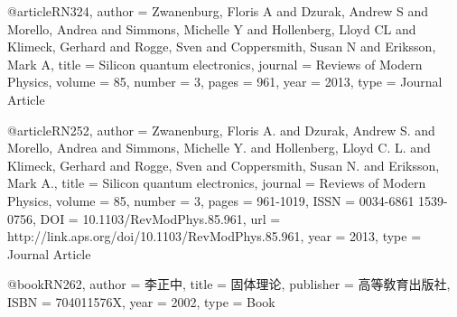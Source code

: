 @article{RN324,
   author = {Zwanenburg, Floris A and Dzurak, Andrew S and Morello, Andrea and Simmons, Michelle Y and Hollenberg, Lloyd CL and Klimeck, Gerhard and Rogge, Sven and Coppersmith, Susan N and Eriksson, Mark A},
   title = {Silicon quantum electronics},
   journal = {Reviews of Modern Physics},
   volume = {85},
   number = {3},
   pages = {961},
   year = {2013},
   type = {Journal Article}
}

@article{RN252,
   author = {Zwanenburg, Floris A. and Dzurak, Andrew S. and Morello, Andrea and Simmons, Michelle Y. and Hollenberg, Lloyd C. L. and Klimeck, Gerhard and Rogge, Sven and Coppersmith, Susan N. and Eriksson, Mark A.},
   title = {Silicon quantum electronics},
   journal = {Reviews of Modern Physics},
   volume = {85},
   number = {3},
   pages = {961-1019},
   ISSN = {0034-6861
1539-0756},
   DOI = {10.1103/RevModPhys.85.961},
   url = {http://link.aps.org/doi/10.1103/RevModPhys.85.961},
   year = {2013},
   type = {Journal Article}
}

@book{RN262,
   author = {李正中},
   title = {固体理论},
   publisher = {高等敎育出版社},
   ISBN = {704011576X},
   year = {2002},
   type = {Book}
}

